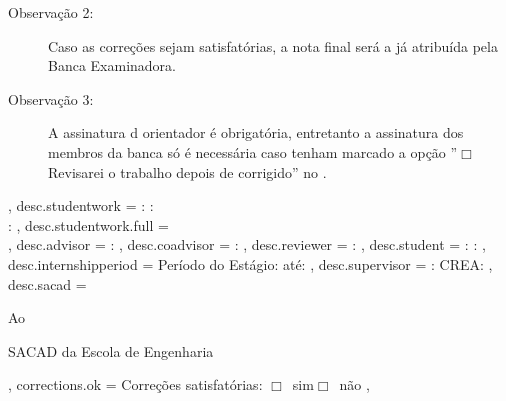 {{\begin{description}
                              \item[Observação 2:] Caso as correções sejam satisfatórias, a nota final será a já atribuída pela Banca Examinadora. 
                              \item[Observação 3:] A assinatura d orientador é obrigatória, entretanto a assinatura dos membros da banca só é necessária caso tenham marcado a opção ''$\Box$ Revisarei o trabalho depois de corrigido'' no \emph{}.
                            \end{description}
                              } ,
  desc.studentwork          = { 
                              \noindent{}: {\bf {}}\hfill {}: {\bf {}}\\%
                              \noindent{}:  } , 
  desc.studentwork.full     = {\\[2.5mm]} ,  
  desc.advisor              = {\noindent{}:  \textbf{}} ,
  desc.coadvisor            = {\noindent{}:  \textbf{}} ,
  desc.reviewer             = {\noindent{}:  \textbf{}} ,
  desc.student              = {\noindent{}: {\bf {}}\hfill 
                              : {\bf {}}} ,
  desc.internshipperiod     = {\noindent Período do Estágio: {\bf {}} até: {\bf {}}} ,
  desc.supervisor           = {: \textbf{} \hfill CREA: \textbf{}} ,
  desc.sacad                = {\noindent Ao\par\noindent SACAD da Escola de Engenharia} ,
  corrections.ok            = {Correções satisfatórias: \hspace*{1cm}$\Box$\ sim\hspace*{2cm}$\Box$\ não} , 
}



